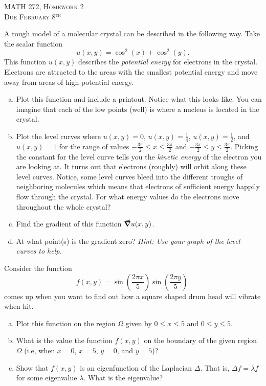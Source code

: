 \documentclass[12pt]{article} %
\begin{document}
\begin{center}
   \textsc{\large MATH 272, Homework 2}\\
   \textsc{Due February 8$^\textrm{th}$}
\end{center}
\vspace{.5cm}



\begin{problem}
A rough model of a molecular crystal can be described in the following way. Take the scalar function
\[
u(x,y)=\cos^2(x)+\cos^2(y).
\]
This function $u(x,y)$ describes the \emph{potential energy} for electrons in the crystal. Electrons are attracted to the areas with the smallest potential energy and move away from areas of high potential energy. 
\begin{enumerate}[(a)]
    \item Plot this function and include a printout.  Notice what this looks like.  You can imagine that each of the low points (well) is where a nucleus is located in the crystal.
    \item Plot the level curves where $u(x,y)=0$, $u(x,y)=\frac{1}{4}$, $u(x,y)=\frac{1}{2}$, and $u(x,y)=1$ for the range of values $-\frac{3\pi}{2}\leq x \leq \frac{3\pi}{2}$ and $-\frac{3\pi}{2}\leq y \leq \frac{3\pi}{2}$. Picking the constant for the level curve tells you the \emph{kinetic energy} of the electron you are looking at.  It turns out that electrons (roughly) will orbit along these level curves.  Notice, some level curves bleed into the different troughs of neighboring molecules which means that electrons of sufficient energy happily flow through the crystal. For what energy values do the electrons move throughout the whole crystal?
    \item Find the gradient of this function $\boldsymbol{\vec{\nabla}} u(x,y)$.
    \item At what point(s) is the gradient zero? \emph{Hint: Use your graph of the level curves to help.}
    \end{enumerate}
\end{problem}



\begin{problem}
Consider the function
\[
f(x,y)=\sin\left(\frac{2\pi x}{5}\right)\sin\left(\frac{2\pi y}{5}\right).
\]
comes up when you want to find out how a square shaped drum head will vibrate when hit. 
\begin{enumerate}[(a)]
    \item Plot this function on the region $\Omega$ given by $0\leq x \leq 5$ and $0\leq y \leq 5$.  
    \item What is the value the function $f(x,y)$ on the boundary of the given region $\Omega$ (i.e, when $x=0$, $x=5$, $y=0$, and $y=5$)?
    \item Show that $f(x,y)$ is an eigenfunction of the Laplacian $\Delta$. That is, $\Delta f = \lambda f$ for some eigenvalue $\lambda$. What is the eigenvalue?
\end{enumerate}
\end{problem}
\end{document}
